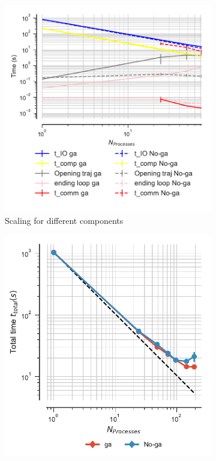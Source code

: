  \begin{figure}[ht!]
\centering
\begin{subfigure}{.3\textwidth}
  \includegraphics[width=\linewidth]{figures/Comparison_IO_compute_scaling_traj_splitting-chain-reader.pdf}
  \captionsetup{format=hang}
  \caption{Scaling for different components}
  \label{fig:MPIscaling-chain-reader}
\end{subfigure}
\hfill
\begin{subfigure}{.3\textwidth}
  \includegraphics[width=\linewidth]{figures/Comparison_tot_time_traj_splitting-chain-reader.pdf}

\end{subfigure}
\end{figure}
